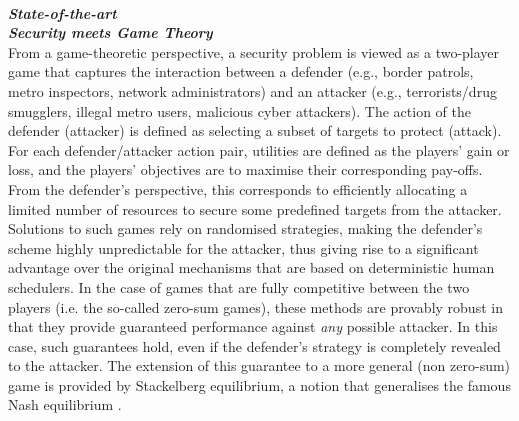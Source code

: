  

 

\noindent \textbf{\textit{\\State-of-the-art}}
\noindent \textbf{\textit{\\Security meets Game Theory }}\\
From a game-theoretic perspective, a security problem is viewed as a two-player game that captures the interaction between a defender (e.g., border patrols, metro inspectors, network administrators) and an attacker (e.g., terrorists/drug smugglers, illegal metro users, malicious cyber attackers). The action of the defender (attacker) is defined as selecting a subset of targets to protect (attack). For each defender/attacker action pair, utilities are defined as the players' gain or loss, and the players' objectives are to maximise their corresponding pay-offs. From the defender's perspective, this corresponds to efficiently allocating a limited number of resources to secure some predefined targets from the attacker. 
Solutions to such games rely on randomised strategies, making the defender's scheme highly unpredictable for the attacker, thus giving rise to a significant advantage over the original mechanisms that are based on deterministic human schedulers. In the case of games that are fully competitive between the two players  (i.e. the so-called zero-sum games), these methods are provably robust in that they provide guaranteed performance against {\em any} possible attacker. In this case, such guarantees hold, even if the defender's strategy is completely revealed to the attacker.  
The extension of this guarantee to a more general (non zero-sum) game is provided by Stackelberg equilibrium, a notion that generalises the famous Nash equilibrium \cite{korzhyk2011stackelberg}. 

